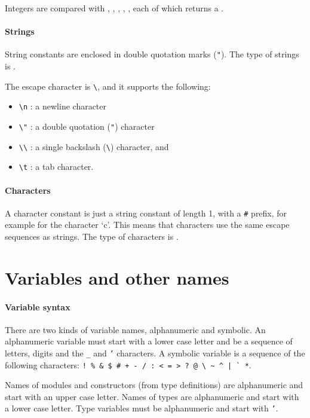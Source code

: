 \documentclass[12pt,a4paper]{book}
\begin{document}
Integers are compared with \smlinline{=}, \smlinline{<}, \smlinline{>}, \smlinline{<=}, \smlinline{>=}, each of which returns a .

\paragraph{Strings} String constants are enclosed in double quotation marks (\texttt{"}). The type of strings is .

The escape character is \verb|\|, and it supports the following:
\begin{itemize}
\item
\verb|\n| : a newline character
\item
\verb|\"| : a double quotation (\texttt{"}) character
\item
\verb|\\| : a single backslash (\verb|\|) character, and
\item
\verb|\t| : a tab character.
\end{itemize}


\paragraph{Characters} A character constant is just a string constant of length
1, with a \texttt{\#} prefix, for example  for the character `c'.
This means that characters use the same escape sequences as strings. The type
of characters is .


\section{Variables and other names}

\paragraph{Variable syntax} There are two kinds of variable names, alphanumeric and symbolic. An alphanumeric variable must start
with a lower case letter and be a sequence of letters, digits and the \texttt{\_} and \texttt{'} characters. A symbolic variable is a sequence of the following characters: \verb)! % & $ # + - / : < = > ? @ \ ~ ^ | ` *).

Names of modules and constructors (from type definitions) are alphanumeric and
start with an upper case letter. Names of types are alphanumeric and start
with a lower case letter.
%
Type variables must be alphanumeric and start with \texttt{'}.
\end{document}
